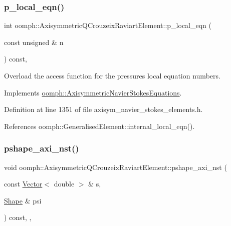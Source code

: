 \subsubsection{\texorpdfstring{p\+\_\+local\+\_\+eqn()}{p\_local\_eqn()}}
{\footnotesize\ttfamily int oomph\+::\+Axisymmetric\+Q\+Crouzeix\+Raviart\+Element\+::p\+\_\+local\+\_\+eqn (\begin{DoxyParamCaption}\item[{const unsigned \&}]{n }\end{DoxyParamCaption}) const\hspace{0.3cm}{\ttfamily [inline]}, {\ttfamily [virtual]}}



Overload the access function for the pressure\textquotesingle{}s local equation numbers. 



Implements \hyperlink{classoomph_1_1AxisymmetricNavierStokesEquations_ad6ac62ca5fa411c365fd2ecc72aa25e8}{oomph\+::\+Axisymmetric\+Navier\+Stokes\+Equations}.



Definition at line 1351 of file axisym\+\_\+navier\+\_\+stokes\+\_\+elements.\+h.



References oomph\+::\+Generalised\+Element\+::internal\+\_\+local\+\_\+eqn().

\mbox{\label{classoomph_1_1AxisymmetricQCrouzeixRaviartElement_a6a16bdbe2fc4e1bfe09123c50d101688}} 
\subsubsection{\texorpdfstring{pshape\+\_\+axi\+\_\+nst()}{pshape\_axi\_nst()}\hspace{0.1cm}{\footnotesize\ttfamily [1/2]}}
{\footnotesize\ttfamily void oomph\+::\+Axisymmetric\+Q\+Crouzeix\+Raviart\+Element\+::pshape\+\_\+axi\+\_\+nst (\begin{DoxyParamCaption}\item[{const \hyperlink{classoomph_1_1Vector}{Vector}$<$ double $>$ \&}]{s,  }\item[{\hyperlink{classoomph_1_1Shape}{Shape} \&}]{psi }\end{DoxyParamCaption}) const\hspace{0.3cm}{\ttfamily [inline]}, {\ttfamily [protected]}, {\ttfamily [virtual]}}



